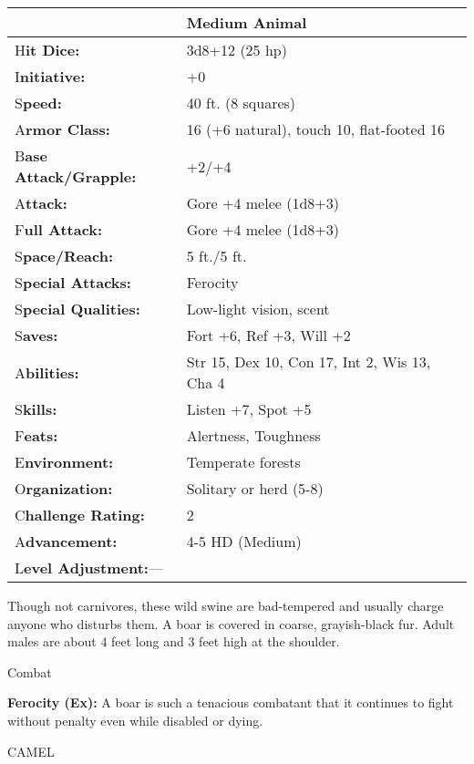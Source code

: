\documentclass{article}
\begin{document}
\begin{tabular}{|>{\raggedright}p{91pt}|>{\raggedright}p{177pt}|}
\hline
  & Medium Animal\tabularnewline
\hline
H\textbf{it Dice:} & 3d8+12 (25 hp)\tabularnewline
\hline
I\textbf{nitiative:} & +0\tabularnewline
\hline
S\textbf{peed:} & 40 ft. (8 squares)\tabularnewline
\hline
A\textbf{rmor Class:} & 16 (+6 natural), touch 10, flat-footed 16\tabularnewline
\hline
B\textbf{ase Attack/Grapple:} & +2/+4\tabularnewline
\hline
A\textbf{ttack:} & Gore +4 melee (1d8+3)\tabularnewline
\hline
F\textbf{ull Attack:} & Gore +4 melee (1d8+3)\tabularnewline
\hline
S\textbf{pace/Reach:} & 5 ft./5 ft.\tabularnewline
\hline
S\textbf{pecial Attacks:} & Ferocity\tabularnewline
\hline
S\textbf{pecial Qualities:} & Low-light vision, scent\tabularnewline
\hline
S\textbf{aves:} & Fort +6, Ref +3, Will +2\tabularnewline
\hline
A\textbf{bilities:} & Str 15, Dex 10, Con 17, Int 2, Wis 13, Cha 4\tabularnewline
\hline
S\textbf{kills:} & Listen +7, Spot +5\tabularnewline
\hline
F\textbf{eats:} & Alertness, Toughness\tabularnewline
\hline
E\textbf{nvironment:} & Temperate forests\tabularnewline
\hline
O\textbf{rganization:} & Solitary or herd (5-8)\tabularnewline
\hline
C\textbf{hallenge Rating:} & 2\tabularnewline
\hline
A\textbf{dvancement:} & 4-5 HD (Medium)\tabularnewline
\hline
L\textbf{evel Adjustment:}--- & \tabularnewline
\hline
\end{tabular}

Though not carnivores, these wild swine are bad-tempered and usually charge anyone 
who disturbs them. A boar is covered in coarse, grayish-black fur. Adult males 
are about 4 feet long and 3 feet high at the shoulder.

Combat

\textbf{Ferocity (Ex):} A boar is such a tenacious combatant that it continues 
to fight without penalty even while disabled or dying.

\vspace{12pt}
CAMEL
\end{document}
